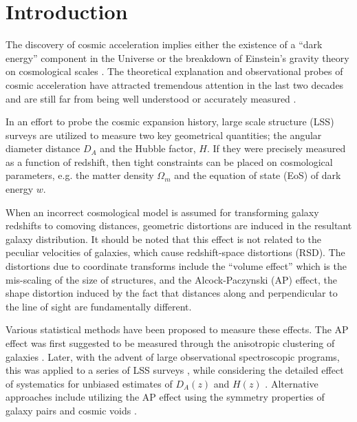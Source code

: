 \documentclass[iop]{emulateapj}
\begin{document}
\section{Introduction}

The discovery of cosmic acceleration \citep{Riess1998,Perl1999} implies either the existence of a ``dark energy'' component in the Universe 
or the breakdown of Einstein's gravity theory on cosmological scales \citep[see ][for a recent review]{2012IJMPD..2130002Y}.
The theoretical explanation and observational probes of cosmic acceleration have attracted 
tremendous attention in the last two decades and are still far from being well understood or accurately measured \citep{SW1989,Li2011,DHW2013}.

In an effort to probe the cosmic expansion history, large scale structure (LSS) surveys are utilized to  measure two key geometrical quantities; 
the angular diameter distance $D_A$ and the Hubble factor, $H$. 
If they were precisely measured as a function of redshift, 
then tight constraints can be placed on cosmological parameters, 
e.g. the matter density $\Omega_m$ and the equation of state (EoS) of dark energy $w$.

When an incorrect cosmological model is assumed for transforming galaxy redshifts to comoving distances,
geometric distortions are induced in the resultant galaxy distribution. 
It should be noted that this effect is not related to the peculiar velocities of galaxies, which cause redshift-space distortions (RSD).
The distortions due to coordinate transforms include the ``volume effect'' which is the mis-scaling of the size of structures, 
and the Alcock-Paczynski (AP) effect, the shape distortion induced by the fact that distances along and perpendicular to the line of sight are fundamentally different.


Various statistical methods have been proposed to measure these effects.
The AP effect was first suggested to be measured through the anisotropic clustering of galaxies \citep{Ballinger1996,Matsubara1996}. 
Later, with the advent of large observational spectroscopic programs, this was applied to a series of LSS surveys
\citep{Outram2004,Blake2011,ChuangWang2012,Reid2012,Beutler2013,Linder2013,2014arXiv1407.2257S, Jeong2014,Sutter2014,2014ApJ...781...96L,Alam2016, Beutler2016, Sanchez2016}, 
while considering the detailed effect of systematics for unbiased estimates of $D_A(z)$ and $H(z)$ \citep{2014MNRAS.445....2V,2016MNRAS.tmp.1473R,2016arXiv160302389S}.
Alternative approaches include utilizing the AP effect using the symmetry properties of galaxy pairs \citep{Marinoni2010,Jennings2011,BB2012}
and cosmic voids \citep{Ryden1995,LavausWandelt1995,Sutter2014,Qingqing2016}.
\end{document}

